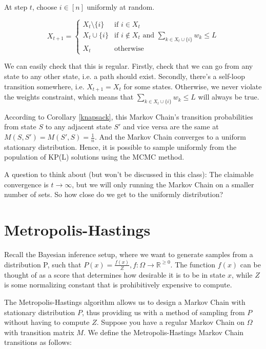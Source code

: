 \documentclass[twoside]{article}
\begin{document}
At step $t$, choose $i \in [n]$ uniformly at random.

$$
X_{t+1} = \begin{cases}
   X_t \setminus \{i\} & \text{if } i \in X_t \\
   X_t \cup \{i\} & \text{if } i \notin X_t \text{ and } \sum_{k \in X_t \cup \{i\}} w_k \leq L\\
   X_t & \text{otherwise}
\end{cases}
$$

We can easily check that this is regular. Firstly, check that we can go from any state to any other state, i.e. a path should exist. Secondly, there's a self-loop transition somewhere, i.e. $X_{t+1}=X_t$ for some states. Otherwise, we never violate the weights constraint, which means that $\sum_{k \in X_t \cup \{i\}} w_k \leq L $ will always be true.

According to Corollary \ref{knapsack}, this Markov Chain's transition probabilities from state $S$ to any adjacent state $S'$ and vice versa are the same at $M(S, S') = M(S', S) = \frac{1}{n}$. And the Markov Chain converges to a uniform stationary distribution. Hence, it is possible to sample uniformly from the population of KP(L) solutions using the MCMC method.

A question to think about (but won't be discussed in this class): The claimable convergence is $t \rightarrow \infty$, but we will only running the Markov Chain on a smaller number of sets. So how close do we get to the uniformly distribution?






\section{Metropolis-Hastings}

Recall the Bayesian inference setup, where we want to generate samples from a distribution P, such that $P(x) = \frac{f(x)}{Z}, f: \Omega \rightarrow \mathbb{R}^{\geq 0}$. The function $f(x)$ can be thought of as a score that determines how desirable it is to be in state $x$, while $Z$ is some normalizing constant that is prohibitively expensive to compute. 

The Metropolis-Hastings algorithm allows us to design a Markov Chain with stationary distribution $P$, thus providing us with a method of sampling from $P$ without having to compute $Z$. Suppose you have a regular Markov Chain on $\Omega$ with transition matrix $M$. We define the Metropolis-Hastings Markov Chain transitions as follows:
\end{document}
